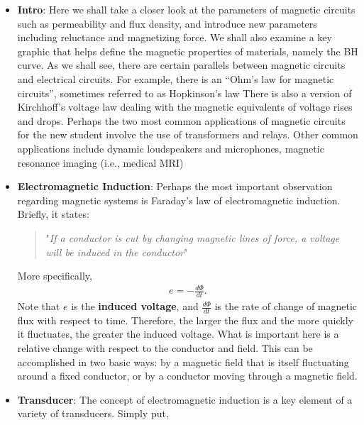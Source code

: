 \documentclass{report}
\begin{document}
    \pagebreak 
    \begin{itemize}
        \item \textbf{Intro}: Here we shall take a closer look at the parameters of magnetic circuits such as permeability and flux density, and introduce new parameters including reluctance and magnetizing force. We shall also examine a key graphic that helps define the magnetic properties of materials, namely the BH curve.        
            \bigbreak \noindent 
            As we shall see, there are certain parallels between magnetic circuits and electrical circuits. For example, there is an “Ohm's law for magnetic circuits”, sometimes referred to as Hopkinson's law
            \bigbreak \noindent 
            There is also a version of Kirchhoff's voltage law dealing with the magnetic equivalents of voltage rises and drops.
            \bigbreak \noindent 
            Perhaps the two most common applications of magnetic circuits for the new student involve the use of transformers and relays.
            \bigbreak \noindent 
            Other common applications include dynamic loudspeakers and microphones, magnetic resonance imaging (i.e., medical MRI)
        \item \textbf{Electromagnetic Induction}: Perhaps the most important observation regarding magnetic systems is Faraday's law of electromagnetic induction. Briefly, it states:
            \begin{quote}
               "\textit{If a conductor is cut by changing magnetic lines of force, a voltage will be induced in the conductor}" 
            \end{quote}
            More specifically, 
            \begin{align*}
                e = -\frac{d\Phi}{dt}
            .\end{align*}
            Note that $e$ is the \textbf{induced voltage}, and $\frac{d\Phi}{dt}$ is the rate of change of magnetic flux with respect to time.
            \bigbreak \noindent 
            Therefore, the larger the flux and the more quickly it fluctuates, the greater the induced voltage. What is important here is a relative change with respect to the conductor and field. This can be accomplished in two basic ways: by a magnetic field that is itself fluctuating around a fixed conductor, or by a conductor moving through a magnetic field.
        \item \textbf{Transducer}: The concept of electromagnetic induction is a key element of a variety of transducers. Simply put,

\end{itemize}
\end{document}
